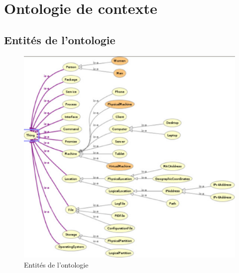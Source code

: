 
\appendix

\chapter{Ontologie de contexte}
\label{appendix:ontology}

\section{Entités de l'ontologie}

\begin{figure}[H]
    \centering
    \includegraphics[width=.8\textwidth]{img/ontology_entities}
    \caption{Entités de l'ontologie}
    \label{fig:ontology_entities}
\end{figure}

